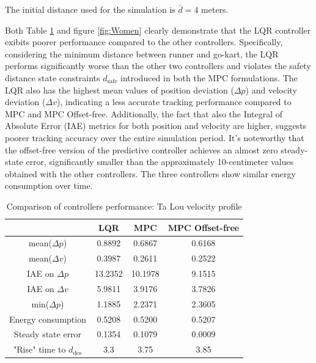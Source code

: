 \documentclass[a4paper,12pt,oneside]{book}
\begin{document}
The initial distance used for the simulation is $\bar{d} = 4$ meters.

\bigskip
Both Table \ref{tab:Ta_Lou} and figure \ref{fig:Women} clearly demonstrate that the LQR controller exibits poorer performance compared to the other controllers.
Specifically, considering the minimum distance between runner and go-kart, the LQR performs significantly worse than the other two controllers and violates the safety distance state constraints $d_{\text{safe}}$ introduced in both the MPC formulations.
The LQR also has the highest mean values of position deviation ($\Delta p$) and velocity deviation ($\Delta v$), indicating a less accurate tracking performance compared to MPC and MPC Offset-free.
Additionally, the fact that also the Integral of Absolute Error (IAE) metrics for both position and velocity are higher, suggests poorer tracking accuracy over the entire simulation period.
It's noteworthy that the offset-free version of the predictive controller achieves an almost zero steady-state error, significantly smaller than the approximately 10-centimeter values obtained with the other controllers. 
The three controllers show similar energy consumption over time.

\begin{table}[htbp]
	\centering
	\begin{tabular}{c|c|c|c}
          & \textbf{LQR} & \textbf{MPC} & \textbf{MPC Offset-free} \\
	\hline
	\hline
	mean($\Delta p$) & 0.8892 & 0.6867 &  0.6168 \\
	mean($\Delta v$) & 0.3987 & 0.2611 & 0.2522 \\
	IAE on $\Delta p$ & 13.2352 & 10.1978 & 9.1515 \\
	IAE on $\Delta v$ & 5.9811 & 3.9176 & 3.7826 \\
	min($\Delta p$) & 1.1885 & 2.2371 & 2.3605 \\
	Energy consumption & 0.5208 & 0.5200 & 0.5207 \\
	Steady state error & 0.1354 & 0.1079 & 0.0009 \\
	"Rise" time to $d_\text{des}$ & 3.3 & 3.75 & 3.85 \\
	\hline
	\end{tabular}
\caption{Comparison of controllers performance: Ta Lou velocity profile }
\label{tab:Ta_Lou}
\end{table}
\end{document}
